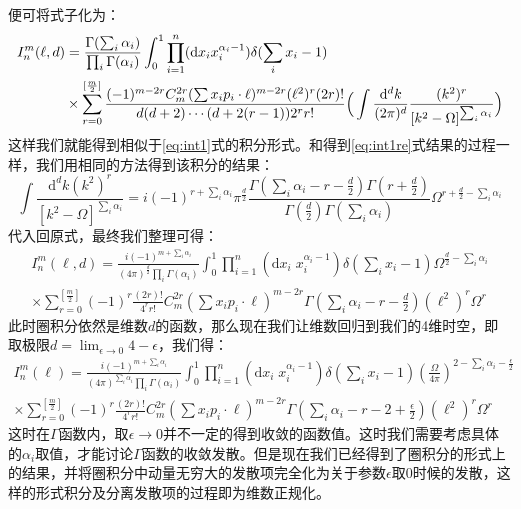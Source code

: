 便可将式子化为：
\begin{align}
I^m_n(\ell,d)&=\frac{\Gamma(\sum_i\alpha_i)}{\prod_i\Gamma(\alpha_i)}\int_0^1\prod_{i=1}^n(\mathrm{d}x_i x_i^{\alpha_i-1})\delta(\sum_i x_i-1)\notag\\
&\times\sum_{r=0}^{[\frac{m}{2}]}\frac{(-1)^{m-2r}C_m^{2r}(\sum x_ip_i\cdot\ell)^{m-2r}(\ell^2)^r(2r)!}{d(d+2)\cdots(d+2(r-1))2^r r!}\Big(\int\frac{\mathrm{d}^dk}{(2\pi)^d}\frac{(k^2)^{r}}{[k^2-\Omega]^{\sum_i\alpha_i}}\Big)
\end{align}
这样我们就能得到相似于\eqref{eq:int1}式的积分形式。和得到\eqref{eq:int1re}式结果的过程一样，我们用相同的方法得到该积分的结果：
\begin{equation}
\int\frac{\mathrm{d}^dk(k^2)^{r}}{[k^2-\Omega]^{\sum_i\alpha_i}}=i(-1)^{r+\sum_i\alpha_i}\pi^{\frac{d}{2}}\frac{\Gamma(\sum_i\alpha_i-r-\frac{d}{2})\Gamma(r+\frac{d}{2})}{\Gamma(\frac{d}{2})\Gamma(\sum_i\alpha_i)}\Omega^{r+\frac{d}{2}-\sum_i\alpha_i}
\end{equation}
代入回原式，最终我们整理可得：
\begin{multline}
	I^m_n(\ell,d)=\frac{i(-1)^{m+\sum_i\alpha_i}}{(4\pi)^{\frac{d}{2}}\prod_i\Gamma(\alpha_i)}\int_0^1\prod_{i=1}^{n}(\mathrm{d}x_i\;x_i^{\alpha_i-1})\delta(\sum_i x_i-1)\Omega^{\frac{d}{2}-\sum_i\alpha_i}\\\times\sum_{r=0}^{[\frac{m}{2}]}(-1)^r\frac{(2r)!}{4^r r!}C^{2r}_m(\sum x_ip_i\cdot\ell)^{m-2r}\Gamma(\sum_i\alpha_i-r-\frac{d}{2})(\ell^2)^r\Omega^{r}
	\label{eq:feyint}
\end{multline}
此时圈积分依然是维数$d$的函数，那么现在我们让维数回归到我们的4维时空，即取极限$d=\lim_{\epsilon\rightarrow 0} 4-\epsilon$，我们得：
\begin{multline}
	I^m_n(\ell)=\frac{i(-1)^{m+\sum_i\alpha_i}}{(4\pi)^{\sum_i\alpha_i}\prod_i\Gamma(\alpha_i)}\int_0^1\prod_{i=1}^{n}(\mathrm{d}x_i\;x_i^{\alpha_i-1})\delta(\sum_i x_i-1)\left(\frac{\Omega}{4\pi}\right)^{2-\sum_i\alpha_i-\frac{\epsilon}{2}}\\\times\sum_{r=0}^{[\frac{m}{2}]}(-1)^r\frac{(2r)!}{4^r r!}C^{2r}_m(\sum x_ip_i\cdot\ell)^{m-2r}\Gamma(\sum_i\alpha_i-r-2+\frac{\epsilon}{2})(\ell^2)^r\Omega^{r}
\end{multline}
这时在$\Gamma$函数内，取$\epsilon\rightarrow0$并不一定的得到收敛的函数值。这时我们需要考虑具体的$\alpha_i$取值，才能讨论$\Gamma$函数的收敛发散。但是现在我们已经得到了圈积分的形式上的结果，并将圈积分中动量无穷大的发散项完全化为关于参数$\epsilon$取0时候的发散，这样的形式积分及分离发散项的过程即为维数正规化。

